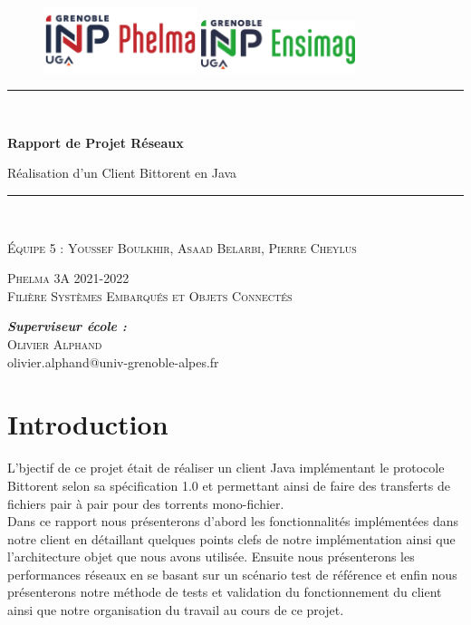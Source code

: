 \documentclass{article}
\begin{document}
\begin{titlepage}

\centering
\begin{figure}
   \includegraphics[width=0.4\textwidth]{logophelma.jpg}
   \hfill
   \includegraphics[width=0.4\textwidth]{logoimag.png}
\end{figure}

\rule{\linewidth}{0.2 mm} \\[0.4 cm]
{\huge\bfseries Rapport de Projet Réseaux \par\vspace{1cm}}
{\Large Réalisation d'un Client Bittorent en Java}
\rule{\linewidth}{0.2 mm} \\[1.0 cm]



{\scshape\Large
Équipe 5 : Youssef Boulkhir, Asaad Belarbi, Pierre Cheylus
\par}
\vspace{1cm}

{\scshape \Large Phelma 3A 2021-2022 \\
Filière Systèmes Embarqués et Objets Connectés \par}
\vspace{7cm}

\begin{flushleft}
\emph{\textbf{Superviseur école :}}\\
\textsc{Olivier Alphand} \\
olivier.alphand@univ-grenoble-alpes.fr\\
\end{flushleft}
\end{titlepage}
\newpage

\tableofcontents
\newpage

\section{Introduction}
L'bjectif de ce projet était de réaliser un client Java implémentant le protocole Bittorent selon sa spécification 1.0 et permettant ainsi de faire des transferts de fichiers pair à pair pour des torrents mono-fichier. \\
Dans ce rapport nous présenterons d'abord les fonctionnalités implémentées dans notre client en détaillant quelques points clefs de notre implémentation ainsi que l'architecture objet que nous avons utilisée. Ensuite nous présenterons les performances réseaux en se basant sur un scénario test de référence et enfin nous présenterons notre méthode de tests et validation du fonctionnement du client ainsi que notre organisation du travail au cours de ce projet.
\end{document}
